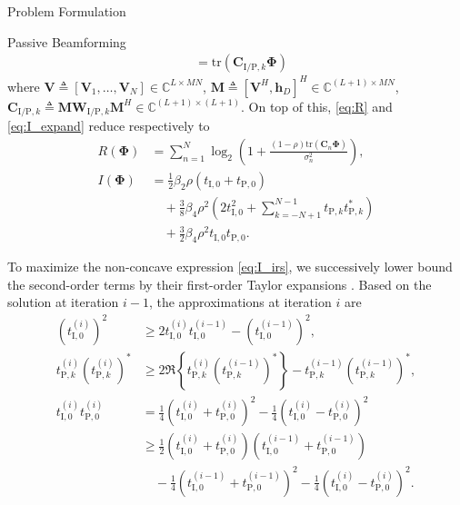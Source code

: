 \documentclass[journal]{IEEEtran}
\begin{document}
\begin{section}{Problem Formulation}
\begin{subsection}{Passive Beamforming}
\begin{align}
				& = \mathrm{tr}(\boldsymbol{C}_{\mathrm{I/P},k}\boldsymbol{\Phi})\label{eq:t_k}
			\end{align}
			where $\boldsymbol{V} \triangleq [\boldsymbol{V}_1,\dots,\boldsymbol{V}_N] \in \mathbb{C}^{L \times MN}$, $\boldsymbol{M} \triangleq [\boldsymbol{V}^H, \boldsymbol{h}_{D}]^H \in \mathbb{C}^{(L+1) \times MN}$, $\boldsymbol{C}_{\mathrm{I/P},k} \triangleq \boldsymbol{M}\boldsymbol{W}_{\mathrm{I/P},k}\boldsymbol{M}^H \in \mathbb{C}^{(L+1)\times(L+1)}$. On top of this, \eqref{eq:R} and \eqref{eq:I_expand} reduce respectively to
			\begin{align}
				R(\boldsymbol{\Phi})
				& = \sum_{n=1}^{N}{\log_2\left(1+\frac{(1-\rho)\mathrm{tr}(\boldsymbol{C}_n\boldsymbol{\Phi})}{\sigma_n^2}\right)},\label{eq:R_irs}\\
				I(\boldsymbol{\Phi})
				& = \frac{1}{2}{\beta_2}{\rho}(t_{\mathrm{I},0}+t_{\mathrm{P},0})\nonumber\\
				& \quad + \frac{3}{8}{\beta_4}{\rho^2} \left(2t_{\mathrm{I},0}^2 + \sum_{k=-N+1}^{N-1}{t_{\mathrm{P},k}t_{\mathrm{P},k}^*}\right)\nonumber\\
				& \quad + \frac{3}{2}{\beta_4}{\rho^2}t_{\mathrm{I},0}t_{\mathrm{P},0}.\label{eq:I_irs}
			\end{align}

			To maximize the non-concave expression \eqref{eq:I_irs}, we successively lower bound the second-order terms by their first-order Taylor expansions \cite{Adali2010}. Based on the solution at iteration $i - 1$, the approximations at iteration $i$ are
			\begin{align}
				(t_{\mathrm{I},0}^{(i)})^2
				& \ge 2 t_{\mathrm{I},0}^{(i)}t_{\mathrm{I},0}^{(i-1)} - (t_{\mathrm{I},0}^{(i-1)})^2,\label{eq:taylor_1}\\
				t_{\mathrm{P},k}^{(i)} (t_{\mathrm{P},k}^{(i)})^*
				& \ge 2 \Re\left\{t_{\mathrm{P},k}^{(i)} (t_{\mathrm{P},k}^{(i-1)})^*\right\} - t_{\mathrm{P},k}^{(i-1)} (t_{\mathrm{P},k}^{(i-1)})^*,\label{eq:taylor_2}\\
				t_{\mathrm{I},0}^{(i)} t_{\mathrm{P},0}^{(i)}
				& = \frac{1}{4}(t_{\mathrm{I},0}^{(i)} + t_{\mathrm{P},0}^{(i)})^2 - \frac{1}{4}(t_{\mathrm{I},0}^{(i)} - t_{\mathrm{P},0}^{(i)})^2\nonumber\\
				& \ge \frac{1}{2}(t_{\mathrm{I},0}^{(i)} + t_{\mathrm{P},0}^{(i)})(t_{\mathrm{I},0}^{(i-1)} + t_{\mathrm{P},0}^{(i-1)})\nonumber\\
				& \quad - \frac{1}{4}(t_{\mathrm{I},0}^{(i-1)} + t_{\mathrm{P},0}^{(i-1)})^2 - \frac{1}{4}(t_{\mathrm{I},0}^{(i)} - t_{\mathrm{P},0}^{(i)})^2.\label{eq:taylor_3}
			\end{align}


\end{subsection}
\end{section}
\end{document}
